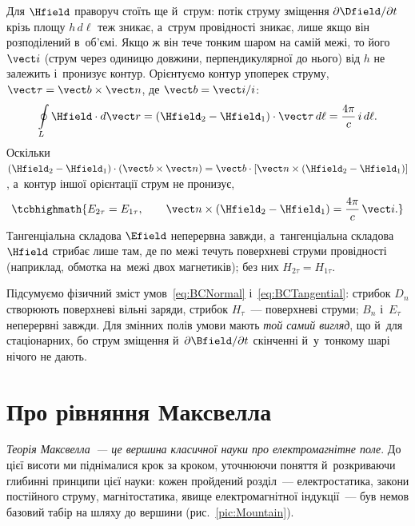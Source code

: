 Для $\Hfield$ праворуч стоїть ще й~струм: потік струму зміщення $\partial\Dfield/\partial t$ крізь площу $h\,d\ell$ теж зникає, а~струм провідності зникає, лише якщо він розподілений в~об'ємі. Якщо ж він тече тонким шаром на самій межі, то його  $\vect i$ (струм через одиницю довжини, перпендикулярної до нього) від $h$ не залежить і~пронизує контур. Орієнтуємо контур упоперек струму, $\vect\tau=\vect b\times\vect n$, де $\vect b=\vect i/i$:
\begin{equation*}
	\oint\limits_L \Hfield\cdot d\vect r = (\Hfield_2-\Hfield_1)\cdot\vect\tau\,d\ell = \frac{4\pi}{c}\,i\,d\ell.
\end{equation*}
Оскільки $(\Hfield_2-\Hfield_1)\cdot(\vect b\times\vect n)=\vect b\cdot[\vect n\times(\Hfield_2-\Hfield_1)]$, а~контур іншої орієнтації струм не пронизує,
\begin{equation}\label{eq:BCTangential}
	\tcbhighmath{
		E_{2\tau} = E_{1\tau}, \qquad \vect n\times\left(\Hfield_2 - \Hfield_1\right) = \frac{4\pi}{c}\,\vect i.
	}
\end{equation}
Тангенціальна складова $\Efield$ неперервна завжди, а~тангенціальна складова $\Hfield$ стрибає лише там, де по межі течуть поверхневі струми провідності (наприклад, обмотка на~межі двох магнетиків); без них $H_{2\tau}=H_{1\tau}$.

Підсумуємо фізичний зміст умов~\eqref{eq:BCNormal} і~\eqref{eq:BCTangential}: стрибок $D_n$ створюють поверхневі вільні заряди, стрибок $H_\tau$~--- поверхневі струми; $B_n$ і~$E_\tau$ неперервні завжди. Для змінних полів умови мають \emph{той самий вигляд}, що й~для стаціонарних, бо струм зміщення й~$\partial\Bfield/\partial t$ скінченні й~у~тонкому шарі нічого не дають.


\section{Про рівняння Максвелла}\hypertarget{about-maxwell-equations}{}


\emph{Теорія Максвелла~--- це вершина класичної науки про електромагнітне поле}. До цієї
висоти ми піднімалися крок за кроком, уточнюючи поняття й~розкриваючи глибинні принципи
цієї науки: кожен пройдений розділ~--- електростатика, закони постійного струму,
магнітостатика, явище електромагнітної індукції~--- був немов базовий табір на шляху до
вершини (рис.~\ref{pic:Mountain}).

